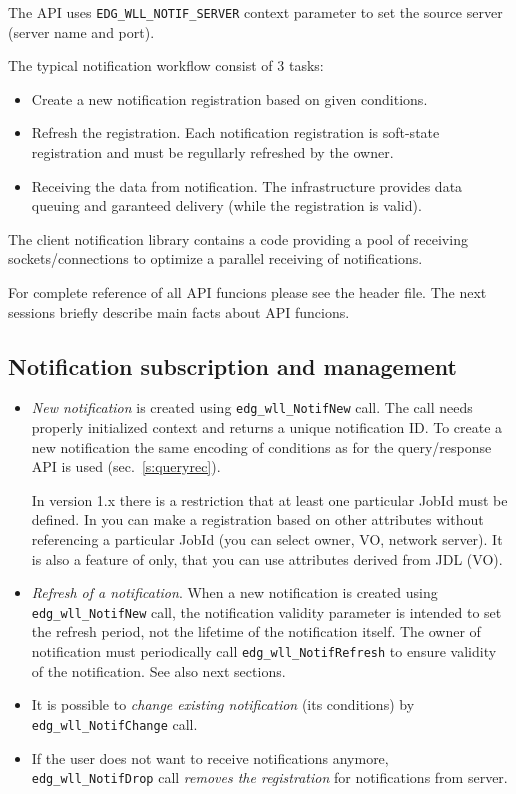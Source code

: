 The API uses \verb'EDG_WLL_NOTIF_SERVER' context parameter to set the
source server (\LB server name and port). 

The typical notification workflow consist of 3 tasks:
\begin{itemize}
 \item Create a new notification registration based on given conditions.
 \item Refresh the registration. Each notification registration is
  soft-state registration and must be regullarly refreshed by the
  owner.
 \item Receiving the data from notification. The \LB infrastructure
  provides data queuing and garanteed delivery (while the registration
  is valid). 
\end{itemize}

The client notification library contains a code providing a pool of
receiving sockets/connections to optimize a parallel receiving of
notifications.

For complete reference of all API funcions please see the header
file. The next sessions briefly describe main facts about API
funcions.

\subsection{Notification subscription and management}
\begin{itemize}
 \item \emph{New notification} is created using
  \verb'edg_wll_NotifNew' call. The call needs properly initialized
  context and returns a unique notification ID. To create a new
  notification the same encoding of conditions as for the \LB
  query/response API is used (sec.~\ref{s:queryrec}). 

  In version 1.x there is a restriction that at least one particular
  JobId must be defined. In  you can make a registration based
  on other attributes without referencing a particular JobId (you can
  select owner, VO, network server).  It is also a feature of 
  only, that you can use attributes derived from JDL (VO).

 \item \emph {Refresh of a notification}. When a new notification is
  created using \verb'edg_wll_NotifNew' call, the notification
  validity parameter is intended to set the refresh period, not the
  lifetime of the notification itself. The owner of notification must
  periodically call \verb'edg_wll_NotifRefresh' to ensure validity of
  the notification. See also next sections.

 \item It is possible to \emph{change existing notification} (its conditions) by
  \verb'edg_wll_NotifChange' call.

 \item If the user does not want to receive notifications anymore,
  \verb'edg_wll_NotifDrop' call \emph{removes the registration} for
  notifications from \LB server.
\end{itemize}

